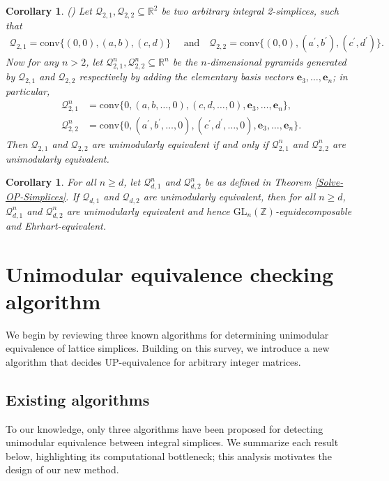 \documentclass[reqno, 12pt]{article}
\newtheorem{cor}[thm]{Corollary}
\theoremstyle{mydefinition}
\theoremstyle{myremark}
\numberwithin{algorithm}{section}
\begin{document}
\begin{cor}{\em (\cite[Theorem 4.1]{Abney-Mcpeek})}
Let $\mathcal{Q}_{2,1}, \mathcal{Q}_{2,2} \subseteq \mathbb{R}^2$ be two arbitrary integral 2-simplices, such that
\begin{align*}
\mathcal{Q}_{2,1} = \mathrm{conv}\{(0,0), (a,b), (c,d)\}\quad \text{ and} \quad \mathcal{Q}_{2,2} = \mathrm{conv}\{(0,0), (a^{\prime},b^{\prime}), (c^{\prime},d^{\prime})\}.
\end{align*}
Now for any $n > 2$, let $\mathcal{Q}^n_{2,1}, \mathcal{Q}^n_{2,2} \subseteq \mathbb{R}^n$ be the $n$-dimensional pyramids generated by $\mathcal{Q}_{2,1}$ and $\mathcal{Q}_{2,2}$ respectively by adding the elementary basis vectors $\mathbf{e}_3, \ldots, \mathbf{e}_n$; in particular,
\begin{align*}
\mathcal{Q}^n_{2,1} &= \mathrm{conv}\{0, (a,b,\ldots,0), (c,d,\ldots,0), \mathbf{e}_3, \ldots, \mathbf{e}_n\},
\\ \mathcal{Q}^n_{2,2} &= \mathrm{conv}\{0, (a^{\prime},b^{\prime},\ldots,0), (c^{\prime},d^{\prime},\ldots,0), \mathbf{e}_3, \ldots, \mathbf{e}_n\}.
\end{align*}
Then $\mathcal{Q}_{2,1}$ and $\mathcal{Q}_{2,2}$ are unimodularly equivalent if and only if $\mathcal{Q}^n_{2,1}$ and $\mathcal{Q}^n_{2,2}$ are unimodularly equivalent.
\end{cor}


\begin{cor}
For all $n\geq d$, let $\mathcal{Q}^n_{d,1}$ and $\mathcal{Q}^n_{d,2}$ be as defined in Theorem \ref{Solve-OP-Simplices}. If $\mathcal{Q}_{d,1}$ and $\mathcal{Q}_{d,2}$ are unimodularly equivalent, then for all $n\geq d$, $\mathcal{Q}^n_{d,1}$ and $\mathcal{Q}^n_{d,2}$ are unimodularly equivalent and hence $\mathrm{GL}_n(\mathbb{Z})$-equidecomposable and Ehrhart-equivalent.
\end{cor}






\section{Unimodular equivalence checking algorithm}
We begin by reviewing three known algorithms for determining unimodular equivalence of lattice simplices.
Building on this survey, we introduce a new algorithm that decides UP-equivalence for arbitrary integer matrices.

\subsection{Existing algorithms}
To our knowledge, only three algorithms have been proposed for detecting unimodular equivalence between integral simplices.
We summarize each result below, highlighting its computational bottleneck; this analysis motivates the design of our new method.
\end{document}
